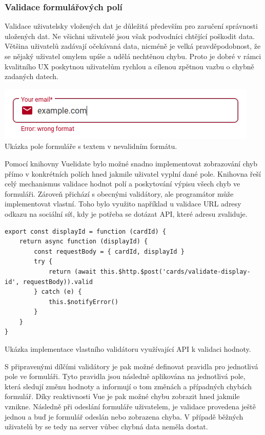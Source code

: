 		\subsubsection{Validace formulářových polí}

		Validace uživatelsky vložených dat je důležitá především pro zaručení správnosti uložených dat.
		Ne všichni uživatelé jsou však podvodníci chtějící poškodit data.
		Většina uživatelů zadávají očekávaná data, nicméně je velká pravděpodobnost, že se nějaký uživatel omylem upíše
		a udělá nechtěnou chybu.
		Proto je dobré v rámci kvalitního \ac{UX} poskytnou uživatelům rychlou a cílenou zpětnou vazbu o chybně zadaných
		datech.

		\includegraphics{obrazky/nevalidni_pole_formulare}\hfill
		Ukázka pole formuláře s textem v nevalidním formátu. %

		Pomocí knihovny Vuelidate bylo možné snadno implementovat zobrazování chyb přímo v konkrétních polích
		hned jakmile uživatel vyplní dané pole.
		Knihovna řeší celý mechanismus validace hodnot polí a poskytování výpisu všech chyb ve formuláři.
		Zároveň přichází s obecnými validátory, ale programátor může implementovat vlastní.
		Toho bylo využito například u validace \ac{URL} adresy odkazu na sociální síť, kdy je potřeba se dotázat \ac{API},
		které adresu zvaliduje.

		\begin{lstlisting}
export const displayId = function (cardId) {
	return async function (displayId) {
		const requestBody = { cardId, displayId }
		try {
	  		return (await this.$http.$post('cards/validate-display-id', requestBody)).valid
		} catch (e) {
		    this.$notifyError()
		}
	}
}
		\end{lstlisting}
		Ukázka implementace vlastního validátoru využívající API k validaci hodnoty. %

		S připravenými dílčími validátory je pak možné definovat pravidla pro jednotlivá pole ve formuláři.
		Tyto pravidla jsou následně aplikována na jednotlivá pole, která sledují změnu hodnoty a informují o tom změnách
		a případných chybách formulář.
		Díky reaktivnosti Vue je pak možné chybu zobrazit hned jakmile vznikne.
		Následně při odeslání formuláře uživatelem, je validace provedena ještě jednou a buď je formulář odeslán nebo
		zobrazena chyba.
		V případě běžných uživatelů by se tedy na server vůbec chybná data neměla dostat.

